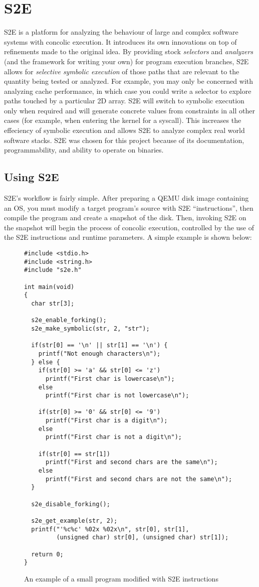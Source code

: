 \documentclass[11pt]{article}
\begin{document}
\section{S2E}
S2E is a platform for analyzing the behaviour of large and complex software
systems with concolic execution. It introduces its own innovations on top of
refinements made to the original idea. By providing stock \textit{selectors}
and \textit{analyzers} (and the framework for writing your own) for program
execution branches, S2E allows
for \textit{selective symbolic execution} of those paths that are relevant to
the quantity being tested or analyzed. For example, you may only be concerned
with analyzing cache performance, in which case you could write a selector to
explore paths touched by a particular 2D array. S2E will switch to symbolic
execution only when required and will generate concrete values from constraints
in all other cases (for example, when entering the kernel for a syscall). This
increases the effeciency of symbolic execution and allows S2E to analyze
complex real world software stacks. S2E was chosen for this project because of
its documentation, programmability, and ability to operate on binaries. 
\subsection{Using S2E}
S2E's workflow is fairly simple. After preparing a QEMU disk image containing an
OS, you must modify a target program's source with S2E ``instructions'', then
compile the program and create a snapshot of the disk. Then, invoking S2E on the
snapshot will begin the process of concolic execution, controlled by the use of
the S2E instructions and runtime parameters. A simple example is shown below:
\begin{figure}[htp]
\begin{verbatim}
#include <stdio.h>
#include <string.h>
#include "s2e.h"

int main(void)
{
  char str[3];

  s2e_enable_forking();
  s2e_make_symbolic(str, 2, "str");

  if(str[0] == '\n' || str[1] == '\n') {
    printf("Not enough characters\n");
  } else {
    if(str[0] >= 'a' && str[0] <= 'z')
      printf("First char is lowercase\n");
    else
      printf("First char is not lowercase\n");

    if(str[0] >= '0' && str[0] <= '9')
      printf("First char is a digit\n");
    else
      printf("First char is not a digit\n");

    if(str[0] == str[1])
      printf("First and second chars are the same\n");
    else
      printf("First and second chars are not the same\n");
  }

  s2e_disable_forking();

  s2e_get_example(str, 2);
  printf("'%c%c' %02x %02x\n", str[0], str[1],
         (unsigned char) str[0], (unsigned char) str[1]);

  return 0;
}
\end{verbatim}
\caption{An example of a small program modified with S2E instructions}
\end{figure}
\end{document}
